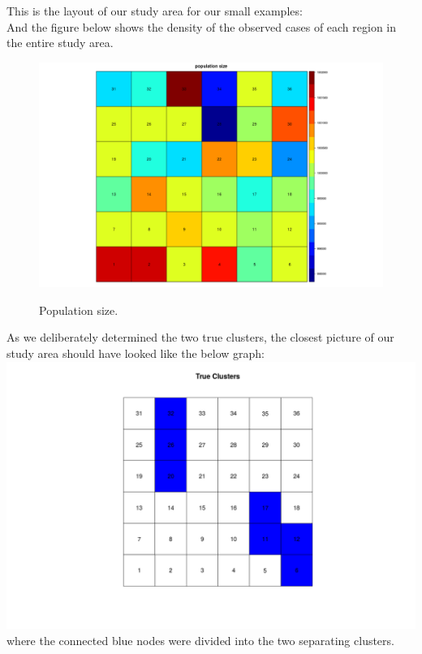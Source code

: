 \documentclass[12pt]{article}
\begin{document}
	This is the layout of our study area for our small examples:\\
		
	
	And the figure below shows the density of the observed cases of each region in the entire study area.\\
	
	\begin{figure}[!ht]
		
		\centering
		\includegraphics[scale=0.2]{Population}\\
		\caption{Population size.\label{f:gull}}
		
	\end{figure}
	
	
	As we deliberately determined the two true clusters, the closest picture of our study area should have looked like the below graph: \\
	
	\includegraphics[scale=0.25]{Ex1_True}\\ where the connected blue nodes were divided into the two separating clusters. \\
	
\end{document}
